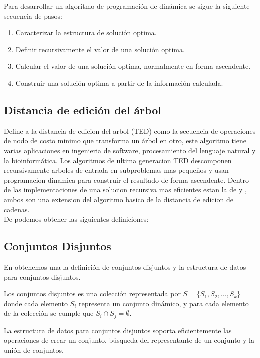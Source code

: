 \noindent Para desarrollar un algoritmo de programación de dinámica se sigue la siguiente secuencia de pasos:
\begin{enumerate}
    \item Caracterizar la estructura de solución optima.
    \item Definir recursivamente el valor de una solución optima.
    \item Calcular el valor de una solución optima, normalmente en forma ascendente.
    \item Construir una solución optima a partir de la información calculada.
\end{enumerate}

\subsection{Distancia de edición del árbol}
\cite{Schwarz2017} Define a la distancia de edicion del arbol (TED) como la secuencia de operaciones de nodo de costo minimo que transforma un árbol en otro, este algoritmo tiene varias aplicaciones en ingenieria de software, procesamiento del lenguaje natural y la bioinformática. Los algoritmos de ultima generacion TED descomponen recursivamente arboles de entrada en subproblemas mas pequeños y usan programacion dinamica para construir el resultado de forma ascendente. Dentro de las implementaciones de una solucion recursiva mas eficientes estan la de \cite{Zhang1989} y \cite{Chen2001}, ambos son una extension del algoritmo basico de la distancia de edicion de cadenas.\\

\noindent De \cite{Benjamin2018} podemos obtener las siguientes definiciones:

\subsection{Conjuntos Disjuntos}
En \cite{Cormen2009} obtenemos una la definición de conjuntos disjuntos y la estructura de datos para conjuntos disjuntos.

Los conjuntos disjuntos es una colección representada por $S=\{ S_1,S_2,...,S_k \}$ donde cada elemento $S_i$ representa un conjunto dinámico, y para cada elemento de la colección se cumple que $S_i \cap S_j = \emptyset$.

La estructura de datos para conjuntos disjuntos soporta eficientemente las operaciones de crear un conjunto, búsqueda del representante de un conjunto y la unión de conjuntos.

